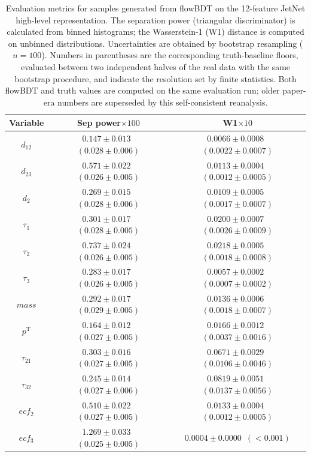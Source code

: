 \documentclass[%
 reprint,
 amsmath,amssymb,
 aps,
prd,
floatfix,
]{revtex4-2}
\begin{document}
\begin{table}[htbp]
\begin{ruledtabular}
        \begin{tabular}{ccc}
        \textbf{Variable} & \textbf{Sep power}$\times 100$ & \textbf{W1}$\times 10$ \\
        \hline
        \textbf{$d_{12}$} & $0.147 \pm 0.013$ \,$(0.028 \pm 0.006)$ & $0.0066 \pm 0.0008$ \,$(0.0022 \pm 0.0007)$ \\
        \textbf{$d_{23}$} & $0.571 \pm 0.022$ \,$(0.026 \pm 0.005)$ & $0.0113 \pm 0.0004$ \,$(0.0012 \pm 0.0005)$ \\
        \textbf{$d_2$} & $0.269 \pm 0.015$ \,$(0.028 \pm 0.006)$ & $0.0109 \pm 0.0005$ \,$(0.0017 \pm 0.0007)$ \\
        \textbf{$\tau_{1}$} & $0.301 \pm 0.017$ \,$(0.028 \pm 0.005)$ & $0.0200 \pm 0.0007$ \,$(0.0026 \pm 0.0009)$ \\
        \textbf{$\tau_{2}$} & $0.737 \pm 0.024$ \,$(0.026 \pm 0.005)$ & $0.0218 \pm 0.0005$ \,$(0.0018 \pm 0.0008)$ \\
        \textbf{$\tau_{3}$} & $0.283 \pm 0.017$ \,$(0.026 \pm 0.005)$ & $0.0057 \pm 0.0002$ \,$(0.0007 \pm 0.0002)$ \\
        \textbf{$mass$} & $0.292 \pm 0.017$ \,$(0.029 \pm 0.005)$ & $0.0136 \pm 0.0006$ \,$(0.0018 \pm 0.0007)$ \\
        \textbf{$p^\mathrm{T}$} & $0.164 \pm 0.012$ \,$(0.027 \pm 0.005)$ & $0.0166 \pm 0.0012$ \,$(0.0037 \pm 0.0016)$ \\
        \textbf{$\tau_{21}$} & $0.303 \pm 0.016$ \,$(0.027 \pm 0.005)$ & $0.0671 \pm 0.0029$ \,$(0.0106 \pm 0.0046)$ \\
        \textbf{$\tau_{32}$} & $0.245 \pm 0.014$ \,$(0.027 \pm 0.006)$ & $0.0819 \pm 0.0051$ \,$(0.0137 \pm 0.0056)$ \\
        \textbf{$ecf_2$} & $0.510 \pm 0.022$ \,$(0.027 \pm 0.005)$ & $0.0133 \pm 0.0004$ \,$(0.0012 \pm 0.0005)$ \\
        \textbf{$ecf_3$} & $1.269 \pm 0.033$ \,$(0.025 \pm 0.005)$ & $0.0004 \pm 0.0000$ \,$(<\!0.001)$ \\
       \end{tabular}

     \caption{Evaluation metrics for samples generated from flowBDT on the 12-feature JetNet high-level representation. The separation power (triangular discriminator) is calculated from binned histograms; the Wasserstein-1 (W1) distance is computed on unbinned distributions. Uncertainties are obtained by bootstrap resampling ($n=100$). Numbers in parentheses are the corresponding truth-baseline floors, evaluated between two independent halves of the real data with the same bootstrap procedure, and indicate the resolution set by finite statistics. Both flowBDT and truth values are computed on the same evaluation run; older paper-era numbers are superseded by this self-consistent reanalysis.}
     \label{tab1}
\end{ruledtabular}
\end{table}
\end{document}
